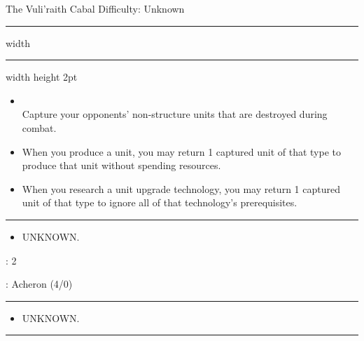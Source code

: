 \newpage
{\handel\Huge The Vuli'raith Cabal} \hfill {\Large Difficulty: Unknown} \vspace{-4pt}\\
\hrule width \hsize \kern 1mm \hrule width \hsize height 2pt


\begin{multicols}{2}


\begin{itemize}
\item {}\\
Capture your opponents' non-structure units that are destroyed during combat.
\item {} When you produce a unit, you may return 1 captured unit of that type to produce that unit without spending resources.
\item {} When you research a unit upgrade technology, you may return 1 captured unit of that type to ignore all of that technology's prerequisites.
\end{itemize}


\vspace{-10pt}\rule{\hsize}{0.4pt}\vspace{5pt}


\vspace{-5pt}
\begin{multicols}{2}
\begin{itemize}
\item UNKNOWN.
\end{itemize}
\end{multicols}

\vspace{-5pt}
: 2

\vspace{2pt}
: Acheron (4/0)

\rule{\hsize}{0.4pt}\vspace{5pt}


\begin{itemize}
\item UNKNOWN. %
\end{itemize}

\vspace{-10pt}\rule{\hsize}{0.4pt}\vspace{5pt}



\end{multicols}
